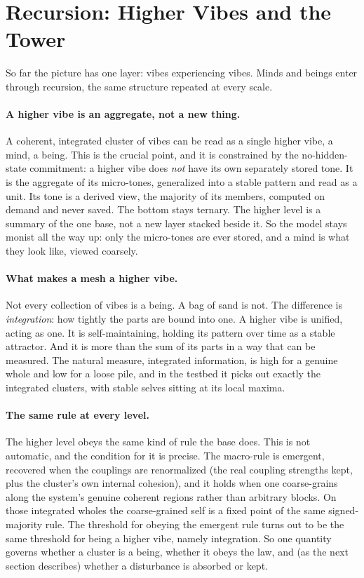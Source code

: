 \section{Recursion: Higher Vibes and the Tower}
\label{sec:recursion}

So far the picture has one layer: vibes experiencing vibes. Minds and beings enter through
recursion, the same structure repeated at every scale.

\paragraph{A higher vibe is an aggregate, not a new thing.}
A coherent, integrated cluster of vibes can be read as a single higher vibe, a mind, a being.
This is the crucial point, and it is constrained by the no-hidden-state commitment: a higher
vibe does \emph{not} have its own separately stored tone. It is the aggregate of its
micro-tones, generalized into a stable pattern and read as a unit. Its tone is a derived view,
the majority of its members, computed on demand and never saved. The bottom stays ternary. The
higher level is a summary of the one base, not a new layer stacked beside it. So the model
stays monist all the way up: only the micro-tones are ever stored, and a mind is what they look
like, viewed coarsely.

\paragraph{What makes a mesh a higher vibe.}
Not every collection of vibes is a being. A bag of sand is not. The difference is
\emph{integration}: how tightly the parts are bound into one. A higher vibe is unified, acting
as one. It is self-maintaining, holding its pattern over time as a stable attractor. And it is
more than the sum of its parts in a way that can be measured. The natural measure, integrated
information, is high for a genuine whole and low for a loose pile, and in the testbed it picks
out exactly the integrated clusters, with stable selves sitting at its local maxima.

\paragraph{The same rule at every level.}
The higher level obeys the same kind of rule the base does. This is not automatic, and the
condition for it is precise. The macro-rule is emergent, recovered when the couplings are
renormalized (the real coupling strengths kept, plus the cluster's own internal cohesion), and
it holds when one coarse-grains along the system's genuine coherent regions rather than
arbitrary blocks. On those integrated wholes the coarse-grained self is a fixed point of the
same signed-majority rule. The threshold for obeying the emergent rule turns out to be the same
threshold for being a higher vibe, namely integration. So one quantity governs whether a
cluster is a being, whether it obeys the law, and (as the next section describes) whether a
disturbance is absorbed or kept.

